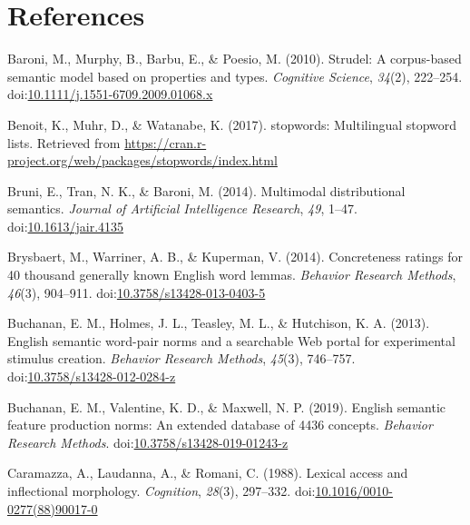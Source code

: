 \documentclass[man]{apa6}
\begin{document}
\newpage

\hypertarget{references}{%
\section{References}\label{references}}

\begingroup
\setlength{\parindent}{-0.5in}
\setlength{\leftskip}{0.5in}

\hypertarget{refs}{}
\leavevmode\hypertarget{ref-Baroni2010}{}%
Baroni, M., Murphy, B., Barbu, E., \& Poesio, M. (2010). Strudel: A corpus-based semantic model based on properties and types. \emph{Cognitive Science}, \emph{34}(2), 222--254. doi:\href{https://doi.org/10.1111/j.1551-6709.2009.01068.x}{10.1111/j.1551-6709.2009.01068.x}

\leavevmode\hypertarget{ref-Benoit2017}{}%
Benoit, K., Muhr, D., \& Watanabe, K. (2017). stopwords: Multilingual stopword lists. Retrieved from \url{https://cran.r-project.org/web/packages/stopwords/index.html}

\leavevmode\hypertarget{ref-Bruni2014}{}%
Bruni, E., Tran, N. K., \& Baroni, M. (2014). Multimodal distributional semantics. \emph{Journal of Artificial Intelligence Research}, \emph{49}, 1--47. doi:\href{https://doi.org/10.1613/jair.4135}{10.1613/jair.4135}

\leavevmode\hypertarget{ref-Brysbaert2014}{}%
Brysbaert, M., Warriner, A. B., \& Kuperman, V. (2014). Concreteness ratings for 40 thousand generally known English word lemmas. \emph{Behavior Research Methods}, \emph{46}(3), 904--911. doi:\href{https://doi.org/10.3758/s13428-013-0403-5}{10.3758/s13428-013-0403-5}

\leavevmode\hypertarget{ref-Buchanan2013}{}%
Buchanan, E. M., Holmes, J. L., Teasley, M. L., \& Hutchison, K. A. (2013). English semantic word-pair norms and a searchable Web portal for experimental stimulus creation. \emph{Behavior Research Methods}, \emph{45}(3), 746--757. doi:\href{https://doi.org/10.3758/s13428-012-0284-z}{10.3758/s13428-012-0284-z}

\leavevmode\hypertarget{ref-Buchanan2019}{}%
Buchanan, E. M., Valentine, K. D., \& Maxwell, N. P. (2019). English semantic feature production norms: An extended database of 4436 concepts. \emph{Behavior Research Methods}. doi:\href{https://doi.org/10.3758/s13428-019-01243-z}{10.3758/s13428-019-01243-z}

\leavevmode\hypertarget{ref-Caramazza1988}{}%
Caramazza, A., Laudanna, A., \& Romani, C. (1988). Lexical access and inflectional morphology. \emph{Cognition}, \emph{28}(3), 297--332. doi:\href{https://doi.org/10.1016/0010-0277(88)90017-0}{10.1016/0010-0277(88)90017-0}
\end{document}

